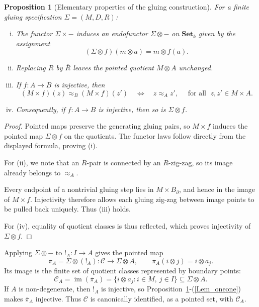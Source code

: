 \documentclass{sn-jnl}%
\theoremstyle{thmstyleone}%
\newtheorem{proposition}[theorem]{Proposition}%
\theoremstyle{thmstyletwo}%
\theoremstyle{thmstylethree}%
\newcommand{\set}{\mathbf{Set}_{k}}
\newcommand{\M}{\Sigma}
\newcommand{\F}{\M\otimes}
\newcommand{\gPoints}{\pi}
\begin{document}
\begin{proposition}[Elementary properties of the gluing construction]
\label{Prop_ElementryPropertiesOfGluingConstruction}
For a finite gluing specification $\Sigma=(M,D,R)$:
\begin{enumerate}[(i)]
    \item  \label{Lem_EndoOnSet_k}
        The functor $\M\times-$ induces an endofunctor $\F-$ on $\set$ given by the assignment
        \begin{equation} \nonumber
            (\F f)(m\otimes a)=m\otimes f(a).
        \end{equation}
    \item \label{Lem:EquivalenceClosureInvariance} 
        Replacing $R$ by $\overline R$ leaves the pointed quotient         $M\otimes A$ unchanged.
    \item \label{Lem_InjectionsReflectGluing}
         If $f:A\to B$ is injective, then
        \begin{equation} \nonumber
            (M\times f)(z)\approx_B(M\times f)(z') \quad \Longleftrightarrow \quad z\approx_A z', \quad  \text{ for all }\; z,z'\in M\times A.
        \end{equation}
    \item \label{Lem_oneone}
        Consequently, if $f: A \to B$ is injective, then so is $\F f$.
\end{enumerate}
\end{proposition}

\begin{proof}
Pointed maps preserve the generating gluing pairs, so $M\times f$ induces the pointed map $\F f$ on the quotients. The functor laws follow directly from the displayed formula, proving (i).  

For (ii), we note that an $\overline R$-pair is connected by an $R$-zig-zag, so its image already belongs to $\approx_A$. 

Every endpoint of a nontrivial gluing step lies in $M\times B_\partial$, and hence in the image of $M\times f$. Injectivity therefore allows each gluing zig-zag between image points to be pulled back uniquely. Thus (iii) holds.

For (iv), equality of quotient classes is thus reflected, which proves injectivity of $\F f$.
\end{proof}

Applying $\F-$ to $!_A:I\to A$ gives the pointed map
\begin{equation}
\nonumber
    \overline{\gPoints}_A=\F(!_A):\mathcal C\longrightarrow\F A,
    \qquad \overline{\gPoints}_A(i\otimes j)=i\otimes a_j.
\end{equation}
Its image is the finite set of quotient classes represented by boundary points:
\begin{equation}
\label{eqn:BoundaryImage}
    \mathcal C_A=\operatorname{im}(\overline{\gPoints}_A)
    =\{i\otimes a_j:i\in M,\ j\in I\}\subseteq\F A.
\end{equation}
If $A$ is non-degenerate, then $!_A$ is injective, so Proposition~\ref{Prop_ElementryPropertiesOfGluingConstruction}-(\ref{Lem_oneone}) makes $\overline{\gPoints}_A$ injective. Thus $\mathcal C$ is canonically identified, as a pointed set, with $\mathcal C_A$.
\end{document}
